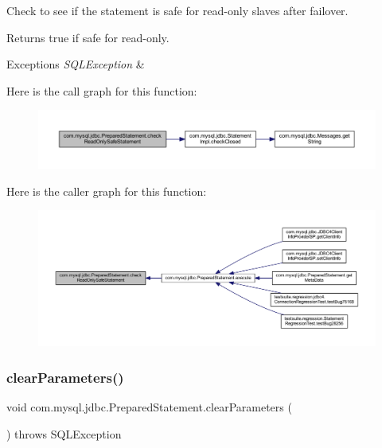 Check to see if the statement is safe for read-\/only slaves after failover.

\begin{DoxyReturn}{Returns}
true if safe for read-\/only. 
\end{DoxyReturn}

\begin{DoxyExceptions}{Exceptions}
{\em S\+Q\+L\+Exception} & \\
\hline
\end{DoxyExceptions}
Here is the call graph for this function\+:
\nopagebreak
\begin{figure}[H]
\begin{center}
\leavevmode
\includegraphics[width=350pt]{classcom_1_1mysql_1_1jdbc_1_1_prepared_statement_af96357c4ef89d1eae553d657f4989bcc_cgraph}
\end{center}
\end{figure}
Here is the caller graph for this function\+:
\nopagebreak
\begin{figure}[H]
\begin{center}
\leavevmode
\includegraphics[width=350pt]{classcom_1_1mysql_1_1jdbc_1_1_prepared_statement_af96357c4ef89d1eae553d657f4989bcc_icgraph}
\end{center}
\end{figure}
\mbox{\label{classcom_1_1mysql_1_1jdbc_1_1_prepared_statement_ac1bd628fd165487d93822d0198ead08a}} 
\subsubsection{\texorpdfstring{clear\+Parameters()}{clearParameters()}}
{\footnotesize\ttfamily void com.\+mysql.\+jdbc.\+Prepared\+Statement.\+clear\+Parameters (\begin{DoxyParamCaption}{ }\end{DoxyParamCaption}) throws S\+Q\+L\+Exception}

